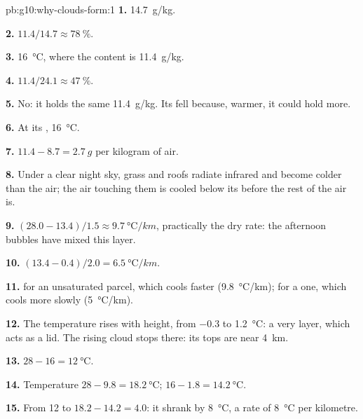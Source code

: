 \begin{solution}{pb:g10:why-clouds-form:1}
\textbf{1.} \qty{14.7}{g/kg}.

\textbf{2.} $11.4/14.7 \approx \qty{78}{\percent}$.

\textbf{3.} \qty{16}{\degreeCelsius}, where the  content is
\qty{11.4}{g/kg}.

\textbf{4.} $11.4/24.1 \approx \qty{47}{\percent}$.

\textbf{5.} No: it holds the same \qty{11.4}{g/kg}. Its 
fell because, warmer, it could hold more.

\textbf{6.} At its , \qty{16}{\degreeCelsius}.

\textbf{7.} $11.4 - 8.7 = \qty{2.7}{g}$ per kilogram of air.

\textbf{8.} Under a clear night sky, grass and roofs radiate infrared and
become colder than the air; the air touching them is cooled below its  before the rest of the air is.

\textbf{9.} $(28.0 - 13.4)/1.5 \approx \qty{9.7}{\degreeCelsius/km}$,
practically the dry rate: the afternoon bubbles have mixed this layer.

\textbf{10.} $(13.4 - 0.4)/2.0 = \qty{6.5}{\degreeCelsius/km}$.

\textbf{11.}  for an unsaturated parcel, which cools faster
(\qty{9.8}{\degreeCelsius/km});  for a  one, which cools
more slowly (\qty{5}{\degreeCelsius/km}).

\textbf{12.} The temperature rises with height, from \num{-0.3} to
\qty{1.2}{\degreeCelsius}: a very  layer, which acts as a lid. The
rising cloud stops there: its tops are near \qty{4}{km}.

\textbf{13.} $28 - 16 = \qty{12}{\degreeCelsius}$.

\textbf{14.} Temperature $28 - 9.8 = \qty{18.2}{\degreeCelsius}$; 
$16 - 1.8 = \qty{14.2}{\degreeCelsius}$.

\textbf{15.} From 12 to $18.2 - 14.2 = 4.0$: it shrank by
\qty{8}{\degreeCelsius}, a rate of \qty{8}{\degreeCelsius} per kilometre.


\end{solution}
